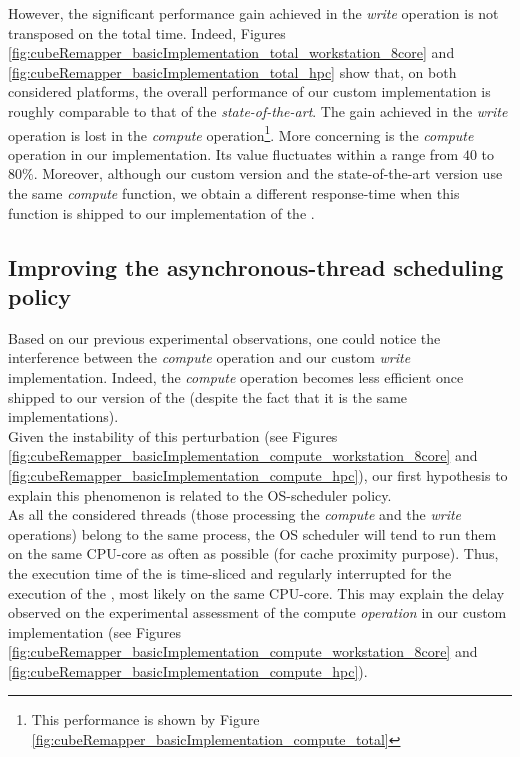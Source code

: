 		However, the significant performance gain achieved in the \emph{write} operation is not transposed on the total time.   Indeed, Figures \ref{fig:cubeRemapper_basicImplementation_total_workstation_8core} and \ref{fig:cubeRemapper_basicImplementation_total_hpc} show that, on both considered platforms, the overall performance of our custom implementation is roughly comparable to that of the \emph{state-of-the-art}.   The gain achieved in the \emph{write} operation is lost in the \emph{compute} operation\footnote{This performance is shown by Figure \ref{fig:cubeRemapper_basicImplementation_compute_total}}.   More concerning is the \emph{compute} operation in our implementation.   Its value fluctuates within a range from $40$ to $80\%$.   Moreover, although our custom version and the state-of-the-art version use the same \emph{compute} function, we obtain a different response-time when this function is shipped to our implementation of the \toolTargetSoftware.\\


	\subsection{Improving the asynchronous-thread scheduling policy} \label{subsection:improveSchedulingPolicy}
		Based on our previous experimental observations, one could notice the interference between the \emph{compute} operation and our custom \emph{write} implementation.   Indeed, the \emph{compute} operation becomes less efficient once shipped to our version of the \toolTargetSoftware\space (despite the fact that it is the same implementations).\\
		Given the instability of this perturbation (see Figures \ref{fig:cubeRemapper_basicImplementation_compute_workstation_8core} and \ref{fig:cubeRemapper_basicImplementation_compute_hpc}), our first hypothesis to explain this phenomenon is related to the OS-scheduler policy.\\

		As all the considered threads (those processing the \emph{compute} and the \emph{write} operations) belong to the same process, the OS scheduler will tend to run them on the same CPU-core as often as possible (for cache proximity purpose).   Thus, the execution time of the \notationaioComputeThread\space is time-sliced and regularly interrupted for the execution of the \notationaioWriteThreads, most likely on the same CPU-core.   This may explain the delay observed on the experimental assessment of the compute \emph{operation} in our custom implementation (see Figures \ref{fig:cubeRemapper_basicImplementation_compute_workstation_8core} and \ref{fig:cubeRemapper_basicImplementation_compute_hpc}).\\

